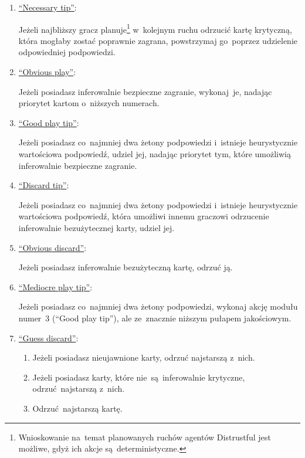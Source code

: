 \documentclass[declaration,shortabstract,inz]{iithesis}
\newcommand{\fn}[1]{\footnote{\hangpara{2.5em}{1} #1}}
\begin{document}
\begin{enumerate}
	\item \underline{``Necessary tip''}:
	
	Jeżeli najbliższy gracz planuje\fn{Wnioskowanie na~temat planowanych ruchów agentów Distrustful jest możliwe, gdyż ich akcje są~deterministyczne.} w~kolejnym ruchu odrzucić kartę krytyczną, która mogłaby zostać poprawnie zagrana, powstrzymaj go~poprzez udzielenie odpowiedniej podpowiedzi.

	\item \underline{``Obvious play''}:
	
	Jeżeli posiadasz inferowalnie bezpieczne zagranie, wykonaj~je, nadając priorytet kartom o~niższych numerach.

	\item \underline{``Good play tip''}:
	
	Jeżeli posiadasz co~najmniej dwa żetony podpowiedzi i~istnieje heurystycznie wartościowa podpowiedź, udziel jej, nadając priorytet tym, które umożliwią inferowalnie bezpieczne zagranie.

	\item \underline{``Discard tip''}:
	
	Jeżeli posiadasz co~najmniej dwa żetony podpowiedzi i~istnieje heurystycznie wartościowa podpowiedź, która umożliwi innemu graczowi odrzucenie inferowalnie bezużytecznej karty, udziel jej.

	\item \underline{``Obvious discard''}:
	
	Jeżeli posiadasz inferowalnie bezużyteczną kartę, odrzuć ją.

	\item \underline{``Mediocre play tip''}:
	
	Jeżeli posiadasz co~najmniej dwa żetony podpowiedzi, wykonaj akcję modułu numer~3 (``Good play tip''), ale ze~znacznie niższym pułapem jakościowym.

	\item \underline{``Guess discard''}:
	\begin{enumerate}
		\item Jeżeli posiadasz nieujawnione karty, odrzuć najstarszą z~nich.
		\item Jeżeli posiadasz karty, które nie~są~inferowalnie krytyczne, odrzuć najstarszą z~nich.
		\item Odrzuć najstarszą kartę.
	\end{enumerate}

\end{enumerate}
\end{document}
